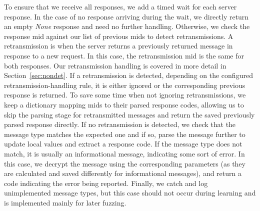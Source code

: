 To ensure that we receive all responses, we add a timed wait for each server response. In the case of no response arriving during the wait, we directly return an empty \textit{None} response and need no further handling. Otherwise, we check the response \ac{mid} against our list of previous \acp{mid} to detect retransmissions. A retransmission is when the server returns a previously returned message in response to a new request. In this case, the retransmission \ac{mid} is the same for both responses. Our retransmission handling is covered in more detail in Section~\ref{sec:nondet}. If a retransmission is detected, depending on the configured retransmission-handling rule, it is either ignored or the corresponding previous response is returned. To save some time when not ignoring retransmissions, we keep a dictionary mapping \acp{mid} to their parsed response codes, allowing us to skip the parsing stage for retransmitted messages and return the saved previously parsed response directly. If no retransmission is detected, we check that the message type matches the expected one and if so, parse the message further to update local values and extract a response code. If the message type does not match, it is usually an informational message, indicating some sort of error. In this case, we decrypt the message using the corresponding parameters (as they are calculated and saved differently for informational messages), and return a code indicating the error being reported. Finally, we catch and log unimplemented message types, but this case should not occur during learning and is implemented mainly for later fuzzing.

